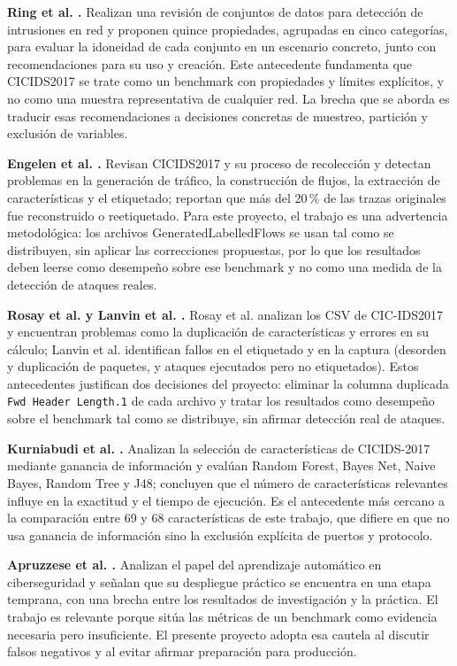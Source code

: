 \documentclass[conference]{IEEEtran}
\begin{document}
\textbf{Ring et al. \cite{ring2019}.} Realizan una revisión de conjuntos de datos para detección de intrusiones en red y proponen quince propiedades, agrupadas en cinco categorías, para evaluar la idoneidad de cada conjunto en un escenario concreto, junto con recomendaciones para su uso y creación. Este antecedente fundamenta que CICIDS2017 se trate como un benchmark con propiedades y límites explícitos, y no como una muestra representativa de cualquier red. La brecha que se aborda es traducir esas recomendaciones a decisiones concretas de muestreo, partición y exclusión de variables.

\textbf{Engelen et al. \cite{engelen2021}.} Revisan CICIDS2017 y su proceso de recolección y detectan problemas en la generación de tráfico, la construcción de flujos, la extracción de características y el etiquetado; reportan que más del 20\,\% de las trazas originales fue reconstruido o reetiquetado. Para este proyecto, el trabajo es una advertencia metodológica: los archivos GeneratedLabelledFlows se usan tal como se distribuyen, sin aplicar las correcciones propuestas, por lo que los resultados deben leerse como desempeño sobre ese benchmark y no como una medida de la detección de ataques reales.

\textbf{Rosay et al. \cite{rosay2022} y Lanvin et al. \cite{lanvin2022}.} Rosay et al. analizan los CSV de CIC-IDS2017 y encuentran problemas como la duplicación de características y errores en su cálculo; Lanvin et al. identifican fallos en el etiquetado y en la captura (desorden y duplicación de paquetes, y ataques ejecutados pero no etiquetados). Estos antecedentes justifican dos decisiones del proyecto: eliminar la columna duplicada \texttt{Fwd Header Length.1} de cada archivo y tratar los resultados como desempeño sobre el benchmark tal como se distribuye, sin afirmar detección real de ataques.

\textbf{Kurniabudi et al. \cite{kurniabudi2020}.} Analizan la selección de características de CICIDS-2017 mediante ganancia de información y evalúan Random Forest, Bayes Net, Naive Bayes, Random Tree y J48; concluyen que el número de características relevantes influye en la exactitud y el tiempo de ejecución. Es el antecedente más cercano a la comparación entre 69 y 68 características de este trabajo, que difiere en que no usa ganancia de información sino la exclusión explícita de puertos y protocolo.

\textbf{Apruzzese et al. \cite{apruzzese2023}.} Analizan el papel del aprendizaje automático en ciberseguridad y señalan que su despliegue práctico se encuentra en una etapa temprana, con una brecha entre los resultados de investigación y la práctica. El trabajo es relevante porque sitúa las métricas de un benchmark como evidencia necesaria pero insuficiente. El presente proyecto adopta esa cautela al discutir falsos negativos y al evitar afirmar preparación para producción.
\end{document}
